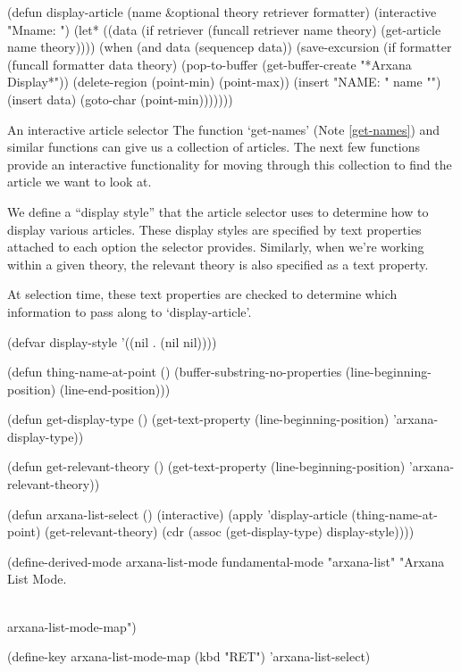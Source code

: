 \begin{elisp}
(defun display-article
  (name &optional theory retriever formatter)
  (interactive "Mname: ")
  (let* ((data (if retriever
                   (funcall retriever name theory)
                 (get-article name theory))))
    (when (and data (sequencep data))
      (save-excursion
        (if formatter
            (funcall formatter data theory)
          (pop-to-buffer (get-buffer-create
                          "*Arxana Display*"))
          (delete-region (point-min) (point-max))
          (insert "NAME: " name "\n\n")
          (insert data)
          (goto-char (point-min)))))))
\end{elisp}

\begin{notate}{An interactive article selector} \label{selector}
The function `get-names' (Note \ref{get-names}) and
similar functions can give us a collection of articles.
The next few functions provide an interactive
functionality for moving through this collection to find
the article we want to look at.

We define a ``display style'' that the article selector
uses to determine how to display various articles.  These
display styles are specified by text properties attached
to each option the selector provides.  Similarly, when
we're working within a given theory, the relevant theory
is also specified as a text property.

At selection time, these text properties are checked to
determine which information to pass along to
`display-article'.
\end{notate}

\begin{elisp}
(defvar display-style '((nil . (nil nil))))

(defun thing-name-at-point ()
  (buffer-substring-no-properties
   (line-beginning-position)
   (line-end-position)))

(defun get-display-type ()
  (get-text-property (line-beginning-position)
                     'arxana-display-type))

(defun get-relevant-theory ()
  (get-text-property (line-beginning-position)
                     'arxana-relevant-theory))

(defun arxana-list-select ()
  (interactive)
  (apply 'display-article
         (thing-name-at-point)
         (get-relevant-theory)
         (cdr (assoc (get-display-type)
                     display-style))))

(define-derived-mode arxana-list-mode fundamental-mode
  "arxana-list" "Arxana List Mode.

\\{arxana-list-mode-map}")

(define-key arxana-list-mode-map (kbd "RET")
            'arxana-list-select)
\end{elisp}

